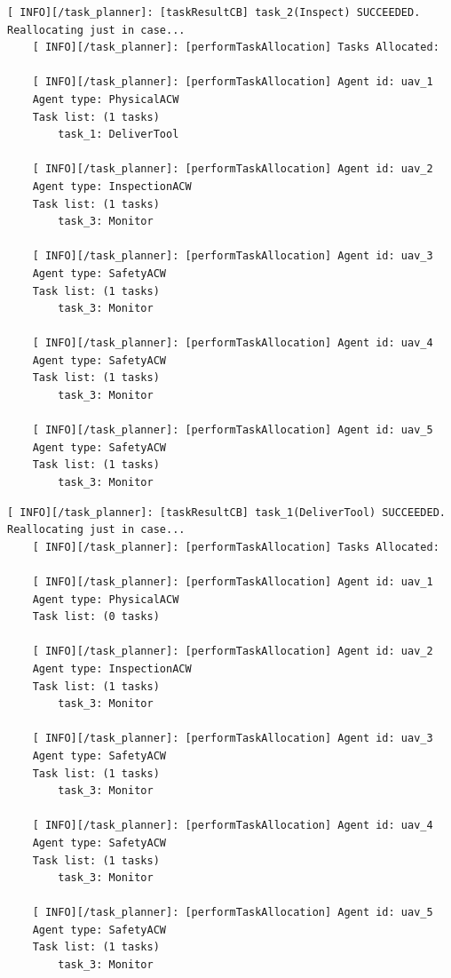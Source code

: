 % 
\begin{lstlisting}[caption={Feedback messages printed afert \emph{Inspection} task ends}, breaklines=true, label=exit:task_2Ends]
    [ INFO][/task_planner]: [taskResultCB] task_2(Inspect) SUCCEEDED. Reallocating just in case...
    [ INFO][/task_planner]: [performTaskAllocation] Tasks Allocated:
    
    [ INFO][/task_planner]: [performTaskAllocation] Agent id: uav_1
    Agent type: PhysicalACW
    Task list: (1 tasks)
        task_1: DeliverTool
    
    [ INFO][/task_planner]: [performTaskAllocation] Agent id: uav_2
    Agent type: InspectionACW
    Task list: (1 tasks)
        task_3: Monitor
    
    [ INFO][/task_planner]: [performTaskAllocation] Agent id: uav_3
    Agent type: SafetyACW
    Task list: (1 tasks)
        task_3: Monitor
    
    [ INFO][/task_planner]: [performTaskAllocation] Agent id: uav_4
    Agent type: SafetyACW
    Task list: (1 tasks)
        task_3: Monitor
    
    [ INFO][/task_planner]: [performTaskAllocation] Agent id: uav_5
    Agent type: SafetyACW
    Task list: (1 tasks)
        task_3: Monitor
\end{lstlisting}


\begin{lstlisting}[caption={Feedback messages printed afert \emph{Tool Delivery} task ends}, breaklines=true, label=exit:task_1Ends]
    [ INFO][/task_planner]: [taskResultCB] task_1(DeliverTool) SUCCEEDED. Reallocating just in case...
    [ INFO][/task_planner]: [performTaskAllocation] Tasks Allocated:
    
    [ INFO][/task_planner]: [performTaskAllocation] Agent id: uav_1
    Agent type: PhysicalACW
    Task list: (0 tasks)
    
    [ INFO][/task_planner]: [performTaskAllocation] Agent id: uav_2
    Agent type: InspectionACW
    Task list: (1 tasks)
        task_3: Monitor
    
    [ INFO][/task_planner]: [performTaskAllocation] Agent id: uav_3
    Agent type: SafetyACW
    Task list: (1 tasks)
        task_3: Monitor
    
    [ INFO][/task_planner]: [performTaskAllocation] Agent id: uav_4
    Agent type: SafetyACW
    Task list: (1 tasks)
        task_3: Monitor
    
    [ INFO][/task_planner]: [performTaskAllocation] Agent id: uav_5
    Agent type: SafetyACW
    Task list: (1 tasks)
        task_3: Monitor
\end{lstlisting}


